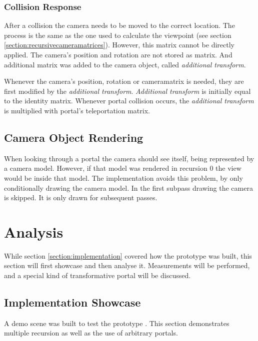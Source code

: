 \subsection{Collision Response}

After a collision the camera needs to be moved to the correct location. The process is the same as the one used to calculate the viewpoint (see section \ref{section:recursivecameramatrices}). However, this matrix cannot be directly applied. The camera's position and rotation are not stored as matrix. And additional matrix was added to the camera object, called \textit{additional transform}.

Whenever the camera's position, rotation or \gls{cameramatrix} is needed, they are first modified by the \textit{additional transform}. \textit{Additional transform} is initially equal to the identity matrix. Whenever portal collision occurs, the \textit{additional transform} is multiplied with portal's teleportation matrix.



\section{Camera Object Rendering}
When looking through a portal the camera should see itself, being represented by a camera model. However, if that model was rendered in recursion 0 the view would be inside that model. The implementation avoids this problem, by only conditionally drawing the camera model. In the first subpass drawing the camera is skipped. It is only drawn for subsequent passes.




\chapter{Analysis}
While section \ref{section:implementation} covered how the prototype was built, this section will first showcase and then analyse it. Measurements will be performed, and a special kind of transformative portal will be discussed.

\section{Implementation Showcase}

A demo scene was built to test the prototype . This section demonstrates multiple recursion as well as the use of arbitrary portals.

